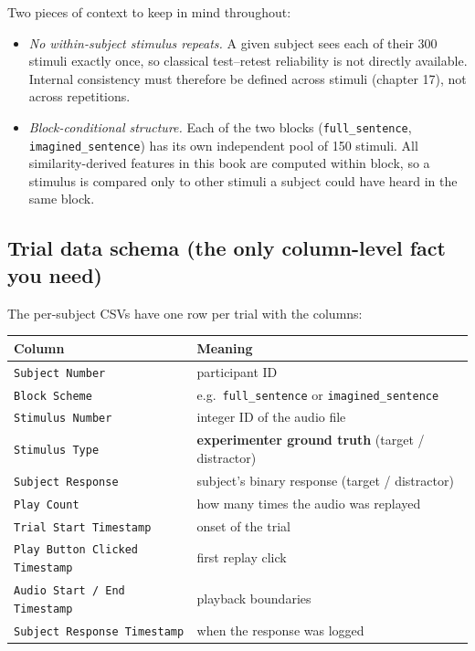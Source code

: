 \documentclass[11pt]{article}
\begin{document}
Two pieces of context to keep in mind throughout:

\begin{itemize}
\item \emph{No within-subject stimulus repeats.} A given subject sees each of
      their 300 stimuli exactly once, so classical test--retest reliability is
      not directly available. Internal consistency must therefore be defined
      across stimuli (chapter 17), not across repetitions.
\item \emph{Block-conditional structure.} Each of the two blocks
      (\texttt{full\_sentence}, \texttt{imagined\_sentence}) has its own
      independent pool of 150 stimuli. All similarity-derived features in this
      book are computed within block, so a stimulus is compared only to other
      stimuli a subject could have heard in the same block.
\end{itemize}

\subsection{Trial data schema (the only column-level fact you need)}

The per-subject CSVs have one row per trial with the columns:

\begin{center}
\begin{tabular}{ll}
\toprule
Column & Meaning \\
\midrule
\texttt{Subject Number}              & participant ID \\
\texttt{Block Scheme}                & e.g.\ \texttt{full\_sentence} or \texttt{imagined\_sentence} \\
\texttt{Stimulus Number}             & integer ID of the audio file \\
\texttt{Stimulus Type}               & \textbf{experimenter ground truth} (target / distractor) \\
\texttt{Subject Response}            & subject's binary response (target / distractor) \\
\texttt{Play Count}                  & how many times the audio was replayed \\
\texttt{Trial Start Timestamp}       & onset of the trial \\
\texttt{Play Button Clicked Timestamp} & first replay click \\
\texttt{Audio Start / End Timestamp} & playback boundaries \\
\texttt{Subject Response Timestamp}  & when the response was logged \\
\bottomrule
\end{tabular}
\end{center}
\end{document}
